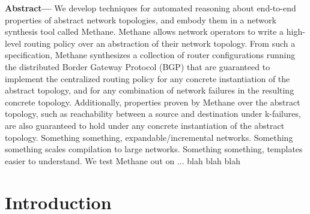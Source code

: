 \documentclass[numbers, 10pt, preprint]{sigplanconf}
\newcommand{\sysname}{{\small \sf Methane}\xspace}
\begin{document}
\textbf{Abstract---}
We develop techniques for automated reasoning about end-to-end properties of
abstract network topologies, and embody them in a network synthesis tool called
\sysname. \sysname allows network operators to write a high-level routing policy
over an abstraction of their network topology. From such a specification,
\sysname synthesizes a collection of router configurations running the
distributed Border Gateway Protocol (BGP) that are guaranteed to implement the
centralized routing policy for any concrete instantiation of the abstract
topology, and for any combination of network failures in the resulting concrete
topology.
%
Additionally, properties proven by \sysname over the abstract topology, such as
reachability between a source and destination under k-failures, are also
guaranteed to hold under any concrete instantiation of the abstract topology.
%
Something something, expandable/incremental networks. Something something scales
compilation to large networks. Something something, templates easier to
understand.
%
%
We test \sysname out on ... blah blah blah



%
%
%
%




%
%
%
%

\section{Introduction} \label{sec:introduction}
\end{document}
